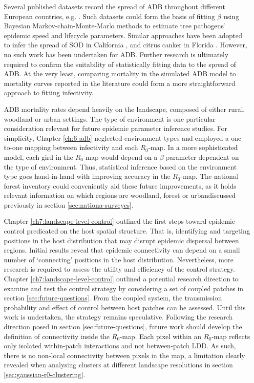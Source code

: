 Several published datasets record the spread of ADB throughout different European countries, e.g. \cite{https://doi.org/10.1111/1365-2745.13383, stocks2017first}. Such datasets could form the basis of fitting $\beta$ using Bayesian Markov-chain-Monte-Marlo methods to estimate tree pathogens' epidemic speed and lifecycle parameters. Similar approaches have been adopted to infer the spread of SOD in California \cite{10.1371/journal.pcbi.1002328}, and citrus canker in Florida \cite{neri2014bayesian}. However, no such work has been undertaken for ADB. Further research is ultimately required to confirm the suitability of statistically fitting data to the spread of ADB. At the very least, comparing mortality in the simulated ADB model to mortality curves reported in the literature \cite{https://doi.org/10.1002/ppp3.11, alonso2015designing, lohmus2014ash} could form a more straightforward approach to fitting infectivity.

ADB mortality rates depend heavily on the landscape, composed of either rural, woodland or urban settings.
The type of environment is one particular consideration relevant for future epidemic parameter inference studies.
For simplicity, Chapter \ref{ch:6-adb} neglected environment types and employed a one-to-one mapping between infectivity and each $R_0$-map. In a more sophisticated model, each gird in the $R_0$-map would depend on a $\beta$ parameter dependent on the type of environment.
Thus, statistical inference based on the environment type goes hand-in-hand with improving accuracy in the $R_0$-map.
The national forest inventory could conveniently aid these future improvements, as it holds relevant information on which regions are woodland, forest or urban\textemdash discussed previously in section \ref{sec:nationa-surveyes}.

Chapter \ref{ch7:landscape-level-control} outlined the first steps toward epidemic control predicated on the host spatial structure. That is, identifying and targeting positions in the host distribution that may disrupt epidemic dispersal between regions. Initial results reveal that epidemic connectivity can depend on a small number of `connecting' positions in the host distribution. Nevertheless, more research is required to assess the utility and efficiency of the control strategy. Chapter \ref{ch7:landscape-level-control}
outlined a potential research direction to examine and test the control strategy by considering a set of coupled patches in section \ref{sec:future-questions}. From the coupled system, the transmission probability and effect of control between host patches can be assessed. Until this work is undertaken, the strategy remains speculative.
Following the research direction posed in section \ref{sec:future-questions}, future work should develop the definition of connectivity inside the $R_0$-map. Each pixel within an $R_0$-map reflects only isolated within-patch interactions and not between-patch LDD. As such, there is no non-local connectivity between pixels in the map, 
a limitation clearly revealed when analysing clusters at different landscape resolutions in section \ref{sec:gaussian-r0-clustering}.

